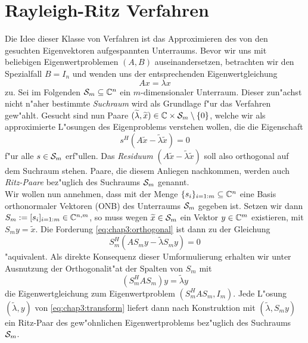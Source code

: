 \section{Rayleigh-Ritz Verfahren}\label{sec:ritz}
Die Idee dieser Klasse von Verfahren ist das Approximieren des von
den gesuchten Eigenvektoren aufgespannten Unterraums.
Bevor wir uns mit beliebigen Eigenwertproblemen $(A,B)$ auseinandersetzen, betrachten wir den Spezialfall $B=I_n$ und wenden uns der entsprechenden Eigenwertgleichung
\[
Ax = \lambda x
\]
zu. Sei im Folgenden $\S_m\subseteq\Cn$ ein $m$-dimensionaler Unterraum. Dieser zun"achst nicht
n"aher bestimmte \emph{Suchraum} wird als Grundlage f"ur das Verfahren gew"ahlt.
Gesucht sind nun Paare $(\widetilde{\lambda}, \widetilde{x})\in\C\times \S_m \setminus\{0\}$,
welche wir als approximierte L"osungen des Eigenproblems verstehen wollen, die
die Eigenschaft
\begin{equation}\label{eq:chap3:orthogonal}
s^H(A\widetilde{x} - \widetilde{\lambda}\widetilde{x})=0
\end{equation}
f"ur alle $s \in \S_m $ erf"ullen. Das \emph{Residuum} $(A\widetilde{x} - \widetilde{\lambda}\widetilde{x})$
soll also orthogonal auf dem Suchraum stehen. Paare, die diesem Anliegen nachkommen,
werden auch \emph{Ritz-Paare} bez"uglich des Suchraums $\S_m$ genannt.\\

Wir wollen nun annehmen, dass mit der Menge $\{s_i\}_{i=1:m}\subseteq \Cn$ eine Basis orthonormaler Vektoren (ONB) des Unterraums $\S_m$ gegeben ist. Setzen wir dann $S_m :=[s_i]_{i=1:m}\in\C^{n,m}$, so muss wegen $\widetilde{x}\in\S_m$
ein Vektor $y\in\C^m$ existieren, mit $S_m y = \widetilde{x}$. Die Forderung \eqref{eq:chap3:orthogonal}
ist dann zu der Gleichung
\[
S_m^H(AS_m y - \widetilde{\lambda} S_m y) = 0
\]
"aquivalent. Als direkte Konsequenz dieser Umformulierung erhalten wir unter Ausnutzung
der Orthogonalit"at der Spalten von $S_m$ mit
\begin{equation}\label{eq:chap3:transform}
(S_m^H A S_m) y = \widetilde{\lambda}y
\end{equation}
die Eigenwertgleichung zum Eigenwertproblem $(S_m^H A S_m, I_m)$. Jede L"osung $(\widetilde{\lambda},y)$ von \eqref{eq:chap3:transform}
liefert dann nach Konstruktion mit $(\widetilde{\lambda}, S_m y)$ ein Ritz-Paar des gew"ohnlichen
Eigenwertproblems bez"uglich des Suchraums $\S_m$.\\

